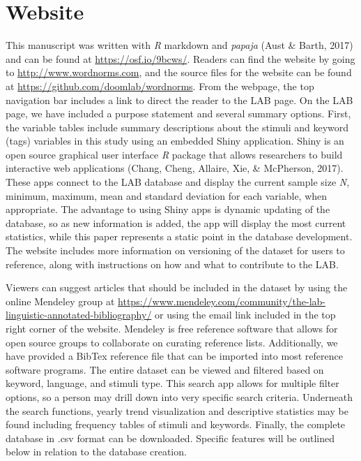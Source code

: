 \documentclass[english,,man]{apa6}
\theoremstyle{definition}
\theoremstyle{definition}
\theoremstyle{definition}
\theoremstyle{remark}
\begin{document}
\hypertarget{website}{%
\section{Website}\label{website}}

This manuscript was written with \emph{R} markdown and \emph{papaja}
(Aust \& Barth, 2017) and can be found at \url{https://osf.io/9bcws/}.
Readers can find the website by going to \url{http://www.wordnorms.com},
and the source files for the website can be found at
\url{https://github.com/doomlab/wordnorms}. From the webpage, the top
navigation bar includes a link to direct the reader to the LAB page. On
the LAB page, we have included a purpose statement and several summary
options. First, the variable tables include summary descriptions about
the stimuli and keyword (tags) variables in this study using an embedded
Shiny application. Shiny is an open source graphical user interface
\emph{R} package that allows researchers to build interactive web
applications (Chang, Cheng, Allaire, Xie, \& McPherson, 2017). These
apps connect to the LAB database and display the current sample size
\emph{N}, minimum, maximum, mean and standard deviation for each
variable, when appropriate. The advantage to using Shiny apps is dynamic
updating of the database, so as new information is added, the app will
display the most current statistics, while this paper represents a
static point in the database development. The website includes more
information on versioning of the dataset for users to reference, along
with instructions on how and what to contribute to the LAB.

Viewers can suggest articles that should be included in the dataset by
using the online Mendeley group at
\url{https://www.mendeley.com/community/the-lab-linguistic-annotated-bibliography/}
or using the email link included in the top right corner of the website.
Mendeley is free reference software that allows for open source groups
to collaborate on curating reference lists. Additionally, we have
provided a BibTex reference file that can be imported into most
reference software programs. The entire dataset can be viewed and
filtered based on keyword, language, and stimuli type. This search app
allows for multiple filter options, so a person may drill down into very
specific search criteria. Underneath the search functions, yearly trend
visualization and descriptive statistics may be found including
frequency tables of stimuli and keywords. Finally, the complete database
in .csv format can be downloaded. Specific features will be outlined
below in relation to the database creation.
\end{document}
